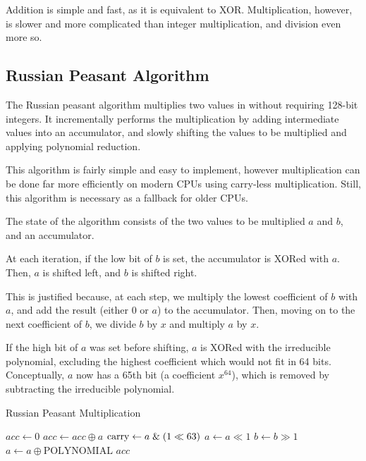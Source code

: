 Addition is simple and fast, as it is equivalent to XOR.
Multiplication, however, is slower and more complicated than integer multiplication, and division even more so.

\subsection{Russian Peasant Algorithm}

The Russian peasant algorithm multiplies two values in  without requiring 128-bit integers.
It incrementally performs the multiplication by adding intermediate values into an accumulator, and slowly shifting the values to be multiplied and applying polynomial reduction.

This algorithm is fairly simple and easy to implement, however multiplication can be done far more efficiently on modern CPUs using carry-less multiplication.
Still, this algorithm is necessary as a fallback for older CPUs.

The state of the algorithm consists of the two values to be multiplied $a$ and $b$, and an accumulator.

At each iteration, if the low bit of $b$ is set, the accumulator is XORed with $a$.
Then, $a$ is shifted left, and $b$ is shifted right.

This is justified because, at each step, we multiply the lowest coefficient of $b$ with $a$, and add the result (either $0$ or $a$) to the accumulator.
Then, moving on to the next coefficient of $b$, we divide $b$ by $x$ and multiply $a$ by $x$.

If the high bit of $a$ was set before shifting, $a$ is XORed with the irreducible polynomial, excluding the highest coefficient which would not fit in 64 bits.
Conceptually, $a$ now has a 65th bit (a coefficient $x^{64}$), which is removed by subtracting the irreducible polynomial.

\begin{algorithm}
\caption{Russian Peasant Multiplication}
\begin{algorithmic}
\State $acc \gets 0$
        \State $acc \gets acc \oplus a$
    \EndIf
    \State $\text{carry} \gets a \;\&\; (1 \ll 63)$
    \State $a \gets a \ll 1$
    \State $b \gets b \gg 1$
        \State $a \gets a \oplus \text{POLYNOMIAL}$ 
    \EndIf
\EndFor
\State \Return $acc$
\EndFunction
\end{algorithmic}
\end{algorithm}

